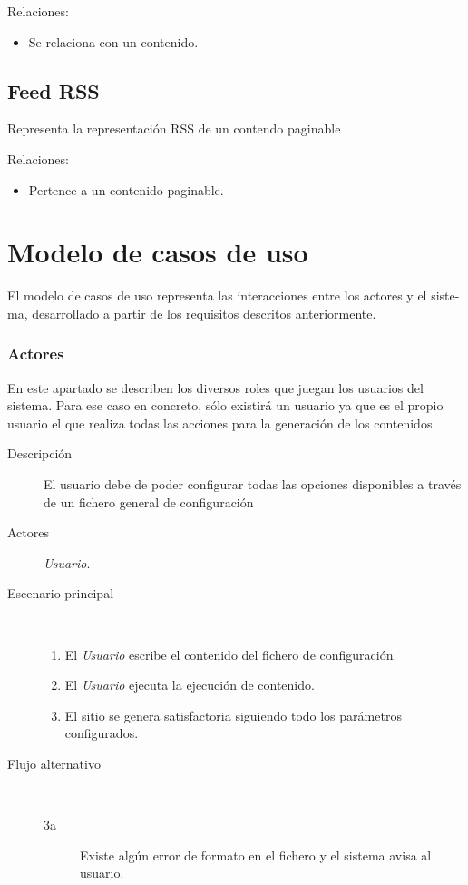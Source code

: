 Relaciones:
\begin{itemize}
    \item Se relaciona con un contenido.
\end{itemize}

\subsection{Feed RSS}

Representa la representación RSS de un contendo paginable

Relaciones:
\begin{itemize}
    \item Pertence a un contenido paginable.
\end{itemize}


\section{Modelo de casos de uso}

El modelo de casos de uso representa las interacciones entre los actores y el siste-
ma, desarrollado a partir de los requisitos descritos anteriormente.

\subsubsection{Actores}

En este apartado se describen los diversos roles que juegan los usuarios del sistema. 
Para ese caso en concreto, sólo existirá un usuario ya que es el propio usuario
el que realiza todas las acciones para la generación de los contenidos.

\begin{description}
    \item[Descripción] El usuario debe de poder configurar todas las opciones disponibles 
        a través de un fichero general de configuración
    \item[Actores] \textit{Usuario}.
    \item[Escenario principal] $\quad$
        \begin{enumerate}
            \item El \textit{Usuario} escribe el contenido del fichero de configuración.
            \item El \textit{Usuario} ejecuta la ejecución de contenido.
            \item El sitio se genera satisfactoria siguiendo todo los parámetros configurados.
        \end{enumerate}
    \item[Flujo alternativo] $\quad$
        \begin{description}
            \item[3a] Existe algún error de formato en el fichero y el sistema avisa al usuario.
        \end{description}
\end{description}

